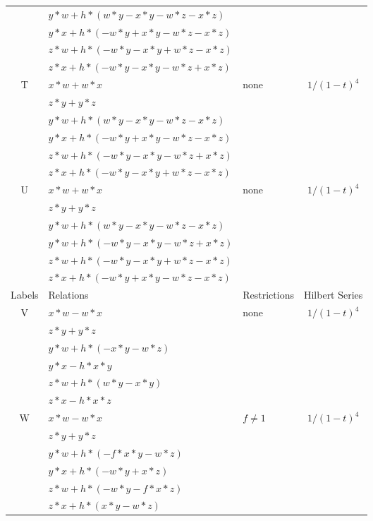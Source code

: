 \documentclass[12]{article}
\begin{document}
\begin{longtable}[c]{|c|p{5.75cm}|p{2.75cm}|c|}
   & $ y*w + h*(w*y - x*y - w*z - x*z ) $ & & \\  
   & $ y*x + h*(-w*y + x*y - w*z - x*z ) $ & & \\  
   & $ z*w + h*(-w*y - x*y + w*z - x*z ) $ & & \\ 
   & $ z*x + h*(-w*y - x*y - w*z + x*z ) $ & &  \\  
\hline
 T & $ x*w + w*x $ &\multirow{6}{*}{none} &\multirow{6}{*}{$ 1/(1-t)^4 $} \\ 
    & $ z*y + y*z $ & &  \\   
   & $ y*w + h*(w*y - x*y - w*z - x*z ) $ & & \\  
   & $ y*x + h*(-w*y + x*y - w*z - x*z ) $ & & \\  
   & $  z*w + h*(-w*y - x*y - w*z + x*z ) $ & & \\ 
   & $  z*x + h*(-w*y - x*y + w*z - x*z ) $ & &  \\  
\hline
 U & $ x*w + w*x $ &\multirow{6}{*}{none} &\multirow{6}{*}{$ 1/(1-t)^4 $} \\ 
    & $ z*y + y*z $ & &  \\   
   & $ y*w + h*(w*y - x*y - w*z - x*z ) $ & & \\ 
   & $ y*w + h*(-w*y - x*y - w*z + x*z ) $ & & \\  
   & $ z*w + h*(-w*y - x*y + w*z - x*z ) $ & & \\ 
   & $ z*x + h*(-w*y + x*y - w*z - x*z ) $ & &  \\  
\hline
\pagebreak
\pagebreak
\midrule[1.0pt]
Labels & Relations & Restrictions & Hilbert Series \\
\hline
 V & $ x*w - w*x $ &\multirow{6}{*}{none} &\multirow{6}{*}{$ 1/(1-t)^4 $} \\ 
    & $ z*y + y*z $ & &  \\ 
   & $ y*w + h*(-x*y - w*z ) $ & & \\  
   & $ y*x - h*x*y $ & & \\  
   & $ z*w + h*(w*y - x*y ) $ & & \\ 
   & $ z*x - h*x*z $ & &  \\  
\hline
 W & $ x*w - w*x $ &\multirow{6}{*}{ $ f \neq 1 $} &\multirow{6}{*}{$ 1/(1-t)^4 $} \\ 
    & $ z*y + y*z $ & &  \\  
   & $ y*w + h*(-f*x*y - w*z ) $ & & \\  
   & $ y*x + h*(-w*y + x*z ) $ & & \\  
   & $ z*w + h*(-w*y - f*x*z ) $ & & \\ 
   & $ z*x + h*(x*y - w*z ) $ & &  \\  

\end{longtable}
\end{document}
